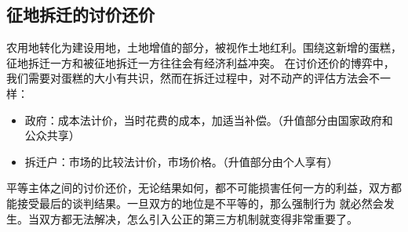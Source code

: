 \documentclass[12pt, a4paper]{article}
\begin{document}
\begin{CJK*}{UTF8}{gbsn}
\begin{flushleft}
        \subsection{征地拆迁的讨价还价}
        农用地转化为建设用地，土地增值的部分，被视作土地红利。围绕这新增的蛋糕，征地拆迁一方和被征地拆迁一方往往会有经济利益冲突。
        在讨价还价的博弈中，我们需要对蛋糕的大小有共识，然而在拆迁过程中，对不动产的评估方法会不一样：
        \begin{itemize}
        \item 政府：成本法计价，当时花费的成本，加适当补偿。（升值部分由国家政府和公众共享）
        \item 拆迁户：市场的比较法计价，市场价格。（升值部分由个人享有）
        \end{itemize}
        平等主体之间的讨价还价，无论结果如何，都不可能损害任何一方的利益，双方都能接受最后的谈判结果。一旦双方的地位是不平等的，那么强制行为
        就必然会发生。当双方都无法解决，怎么引入公正的第三方机制就变得非常重要了。

        \end{flushleft}
    \end{CJK*}
\end{document}
